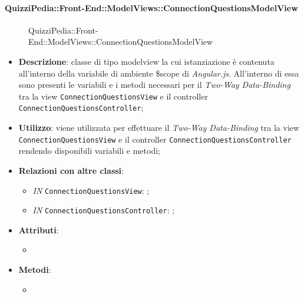 \paragraph{QuizziPedia::Front-End::ModelViews::ConnectionQuestionsModelView}
\begin{figure} [ht]
	\centering
	\caption{QuizziPedia::Front-End::ModelViews::ConnectionQuestionsModelView}
\end{figure} \FloatBarrier
\begin{itemize}
	\item \textbf{Descrizione}: classe di tipo modelview la cui istanziazione è contenuta all'interno della variabile di ambiente \$scope di \textit{Angular.js}. All'interno di essa sono presenti le variabili e i metodi necessari per il \textit{Two-Way Data-Binding} tra la view \texttt{ConnectionQuestionsView} e il controller \texttt{ConnectionQuestionsController}; 
	\item \textbf{Utilizzo}: viene utilizzata per effettuare il \textit{Two-Way Data-Binding} tra la view \texttt{ConnectionQuestionsView} e il controller \texttt{ConnectionQuestionsController} rendendo disponibili variabili e metodi;
	\item \textbf{Relazioni con altre classi}:
	\begin{itemize}
		\item \textit{IN} \texttt{ConnectionQuestionsView}: ; 
		\item \textit{IN} \texttt{ConnectionQuestionsController}: ;
	\end{itemize}
	\item \textbf{Attributi}:
	\begin{itemize}
		\item
	\end{itemize}
	\item \textbf{Metodi}:
	\begin{itemize}
		\item 
	\end{itemize}
\end{itemize}

